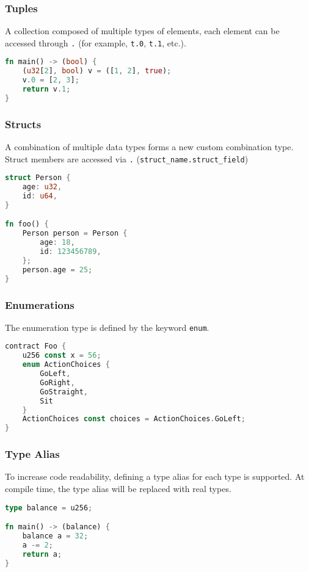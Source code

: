 \subsubsection*{Tuples}

A collection composed of multiple types of elements, each element can be accessed through \texttt{.} (for example, \texttt{t.0}, \texttt{t.1}, etc.).

\begin{lstlisting}[language=rust]
fn main() -> (bool) {
    (u32[2], bool) v = ([1, 2], true);
    v.0 = [2, 3];
    return v.1;
}
\end{lstlisting}

\subsubsection*{Structs}

A combination of multiple data types forms a new custom combination type. Struct members are accessed via \texttt{.} (\texttt{struct\_name.struct\_field})

\begin{lstlisting}[language=rust]
struct Person {
    age: u32,
    id: u64,
}

fn foo() {
    Person person = Person {
        age: 18,
        id: 123456789,
    };
    person.age = 25;
}
\end{lstlisting}

\subsubsection*{Enumerations}

The enumeration type is defined by the keyword \texttt{enum}.

\begin{lstlisting}[language=rust]
contract Foo {
    u256 const x = 56;
    enum ActionChoices {
        GoLeft,
        GoRight,
        GoStraight,
        Sit
    }
    ActionChoices const choices = ActionChoices.GoLeft;
}
\end{lstlisting}


\subsubsection*{Type Alias}

To increase code readability, defining a type alias for each type is supported. At compile time, the type alias will be replaced with real types.

\begin{lstlisting}[language=rust]
type balance = u256;

fn main() -> (balance) {
    balance a = 32;
    a -= 2;
    return a;
}
\end{lstlisting}

